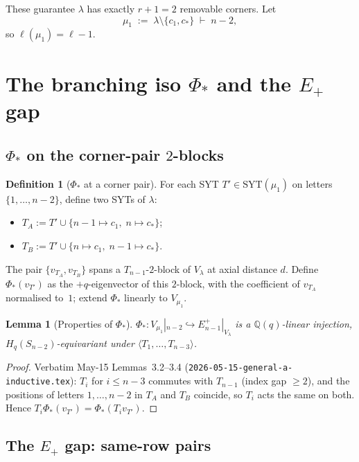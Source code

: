 \documentclass[11pt]{article}
\newtheorem{lemma}[theorem]{Lemma}
\theoremstyle{definition}
\newtheorem{definition}[theorem]{Definition}
\begin{document}
These guarantee $\lambda$ has exactly $r + 1 = 2$ removable corners.
Let
\[
   \mu_1 \;:=\; \lambda \setminus \{c_1, c_*\} \;\vdash\; n - 2,
\]
so $\ell(\mu_1) = \ell - 1$.

\section{The branching iso $\Phi_*$ and the $E_+$ gap}\label{sec:Phi}

\subsection{$\Phi_*$ on the corner-pair $2$-blocks}

\begin{definition}[$\Phi_*$ at a corner pair]\label{def:Phi}
For each SYT $T' \in \mathrm{SYT}(\mu_1)$ on letters $\{1, \ldots, n-2\}$,
define two SYTs of $\lambda$:
\begin{itemize}[leftmargin=2em,topsep=0.2em,itemsep=0.1em]
\item $T_A := T' \cup \{n-1 \mapsto c_1,\; n \mapsto c_*\}$;
\item $T_B := T' \cup \{n   \mapsto c_1,\; n-1 \mapsto c_*\}$.
\end{itemize}
The pair $\{v_{T_A}, v_{T_B}\}$ spans a $T_{n-1}$-$2$-block of $V_\lambda$
at axial distance $d$. Define $\Phi_*(v_{T'})$ as the $+q$-eigenvector
of this $2$-block, with the coefficient of $v_{T_A}$ normalised to~$1$;
extend $\Phi_*$ linearly to $V_{\mu_1}$.
\end{definition}

\begin{lemma}[Properties of $\Phi_*$]\label{lem:Phi-properties}
$\Phi_* : V_{\mu_1}|_{n-2} \hookrightarrow E_{n-1}^+|_{V_\lambda}$ is a
$\mathbb{Q}(q)$-linear injection, $H_q(S_{n-2})$-equivariant under
$\langle T_1, \ldots, T_{n-3}\rangle$.
\end{lemma}

\begin{proof}
Verbatim May-15 Lemmas~3.2--3.4 (\texttt{2026-05-15-general-a-inductive.tex}):
$T_i$ for $i \le n-3$ commutes with $T_{n-1}$ (index gap $\ge 2$), and
the positions of letters $1, \ldots, n-2$ in $T_A$ and $T_B$ coincide,
so $T_i$ acts the same on both. Hence
$T_i \Phi_*(v_{T'}) = \Phi_*(T_i v_{T'})$.
\end{proof}

\subsection{The $E_+$ gap: same-row pairs}\label{subsec:same-row}
\end{document}
